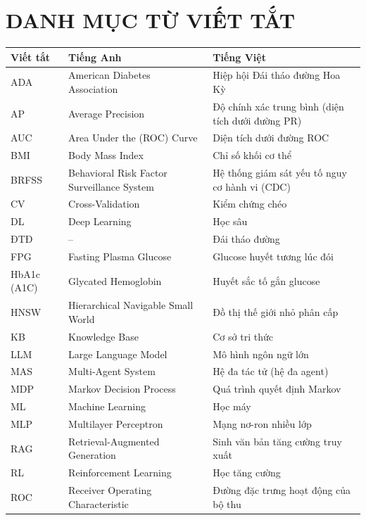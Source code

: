 \documentclass[12pt,a4paper]{report}
\begin{document}
\chapter*{DANH MỤC TỪ VIẾT TẮT}
\begin{center}
\begin{tabular}{@{}L{2.2cm}L{5.2cm}L{5.8cm}@{}}
\toprule
\textbf{Viết tắt} & \textbf{Tiếng Anh} & \textbf{Tiếng Việt}\\
\midrule
ADA & American Diabetes Association & Hiệp hội Đái tháo đường Hoa Kỳ\\
AP & Average Precision & Độ chính xác trung bình (diện tích dưới đường PR)\\
AUC & Area Under the (ROC) Curve & Diện tích dưới đường ROC\\
BMI & Body Mass Index & Chỉ số khối cơ thể\\
BRFSS & Behavioral Risk Factor Surveillance System & Hệ thống giám sát yếu tố nguy cơ hành vi (CDC)\\
CV & Cross-Validation & Kiểm chứng chéo\\
DL & Deep Learning & Học sâu\\
ĐTĐ & -- & Đái tháo đường\\
FPG & Fasting Plasma Glucose & Glucose huyết tương lúc đói\\
HbA1c (A1C) & Glycated Hemoglobin & Huyết sắc tố gắn glucose\\
HNSW & Hierarchical Navigable Small World & Đồ thị thế giới nhỏ phân cấp\\
KB & Knowledge Base & Cơ sở tri thức\\
LLM & Large Language Model & Mô hình ngôn ngữ lớn\\
MAS & Multi-Agent System & Hệ đa tác tử (hệ đa agent)\\
MDP & Markov Decision Process & Quá trình quyết định Markov\\
ML & Machine Learning & Học máy\\
MLP & Multilayer Perceptron & Mạng nơ-ron nhiều lớp\\
RAG & Retrieval-Augmented Generation & Sinh văn bản tăng cường truy xuất\\
RL & Reinforcement Learning & Học tăng cường\\
ROC & Receiver Operating Characteristic & Đường đặc trưng hoạt động của bộ thu\\
\bottomrule
\end{tabular}
\end{center}
\clearpage
\end{document}
